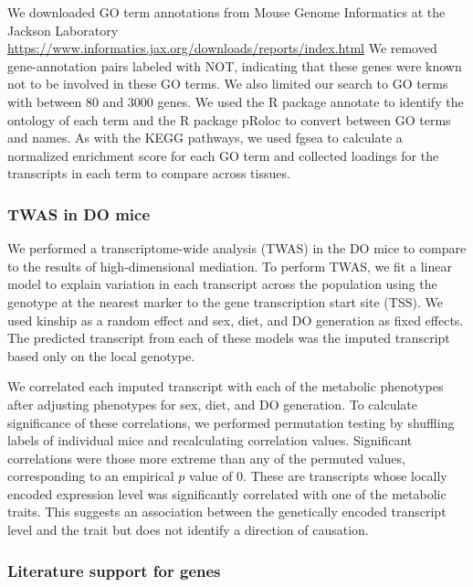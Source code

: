 \documentclass[
]{article}
\begin{document}
We downloaded GO term annotations from Mouse Genome Informatics at the
Jackson Laboratory \cite{pmid33231642}
\url{https://www.informatics.jax.org/downloads/reports/index.html} We
removed gene-annotation pairs labeled with NOT, indicating that these
genes were known not to be involved in these GO terms. We also limited
our search to GO terms with between 80 and 3000 genes. We used the R
package annotate \cite{R_annotate} to identify the ontology of each term
and the R package pRoloc \cite{pmid24413670} to convert between GO terms
and names. As with the KEGG pathways, we used fgsea to calculate a
normalized enrichment score for each GO term and collected loadings for
the transcripts in each term to compare across tissues.

\subsubsection{TWAS in DO mice}\label{twas-in-do-mice}

We performed a transcriptome-wide analysis (TWAS) \cite{pmid26258848, 
pmid26854917} in the DO mice to compare to the results of
high-dimensional mediation. To perform TWAS, we fit a linear model to
explain variation in each transcript across the population using the
genotype at the nearest marker to the gene transcription start site
(TSS). We used kinship as a random effect and sex, diet, and DO
generation as fixed effects. The predicted transcript from each of these
models was the imputed transcript based only on the local genotype.

We correlated each imputed transcript with each of the metabolic
phenotypes after adjusting phenotypes for sex, diet, and DO generation.
To calculate significance of these correlations, we performed
permutation testing by shuffling labels of individual mice and
recalculating correlation values. Significant correlations were those
more extreme than any of the permuted values, corresponding to an
empirical \(p\) value of 0. These are transcripts whose locally encoded
expression level was significantly correlated with one of the metabolic
traits. This suggests an association between the genetically encoded
transcript level and the trait but does not identify a direction of
causation.

\subsubsection{Literature support for
genes}\label{literature-support-for-genes}
\end{document}

